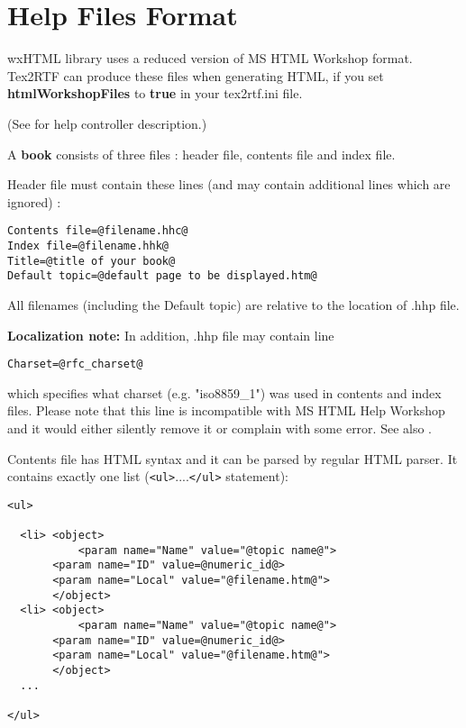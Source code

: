 \section{Help Files Format}\label{helpformat}

wxHTML library uses a reduced version of MS HTML Workshop format.
Tex2RTF can produce these files when generating HTML, if you set {\bf htmlWorkshopFiles} to {\bf true} in
your tex2rtf.ini file.

(See  for help controller description.)

A {\bf book} consists of three files : header file, contents file and index file.


Header file must contain these lines (and may contain additional lines which are ignored) :

\begin{verbatim}
Contents file=@filename.hhc@
Index file=@filename.hhk@
Title=@title of your book@
Default topic=@default page to be displayed.htm@
\end{verbatim}

All filenames (including the Default topic) are relative to the 
location of .hhp file.

{\bf Localization note:} In addition, .hhp file may contain line

\begin{verbatim}
Charset=@rfc_charset@
\end{verbatim}

which specifies what charset (e.g. "iso8859\_1") was used in contents
and index files. Please note that this line is incompatible with
MS HTML Help Workshop and it would either silently remove it or complain
with some error. See also 
.


Contents file has HTML syntax and it can be parsed by regular HTML parser. It contains exactly one list
(\verb$<ul>$....\verb$</ul>$ statement):

\begin{verbatim}
<ul>

  <li> <object>
           <param name="Name" value="@topic name@">
	   <param name="ID" value=@numeric_id@>
	   <param name="Local" value="@filename.htm@">
       </object>
  <li> <object>
           <param name="Name" value="@topic name@">
	   <param name="ID" value=@numeric_id@>
	   <param name="Local" value="@filename.htm@">
       </object>
  ...    

</ul>
\end{verbatim}

